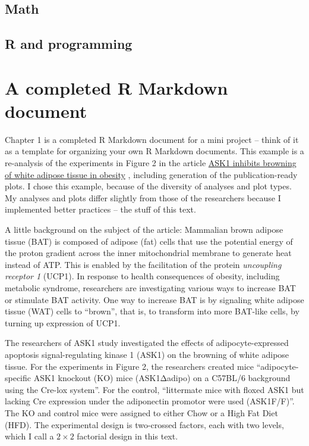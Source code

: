 \documentclass[]{book}
\begin{document}
\hypertarget{math}{%
\section{Math}\label{math}}

\hypertarget{r-and-programming}{%
\section{R and programming}\label{r-and-programming}}

\hypertarget{a-completed-r-markdown-document}{%
\chapter*{A completed R Markdown document}\label{a-completed-r-markdown-document}}

Chapter 1 is a completed R Markdown document for a mini project -- think of it as a template for organizing your own R Markdown documents. This example is a re-analysis of the experiments in Figure 2 in the article \href{https://www.nature.com/articles/s41467-020-15483-7}{ASK1 inhibits browning of white adipose tissue in obesity} , including generation of the publication-ready plots. I chose this example, because of the diversity of analyses and plot types. My analyses and plots differ slightly from those of the researchers because I implemented better practices -- the stuff of this text.

A little background on the subject of the article: Mammalian brown adipose tissue (BAT) is composed of adipose (fat) cells that use the potential energy of the proton gradient across the inner mitochondrial membrane to generate heat instead of ATP. This is enabled by the facilitation of the protein \emph{uncoupling receptor 1} (UCP1). In response to health consequences of obesity, including metabolic syndrome, researchers are investigating various ways to increase BAT or stimulate BAT activity. One way to increase BAT is by signaling white adipose tissue (WAT) cells to ``brown'', that is, to transform into more BAT-like cells, by turning up expression of UCP1.

The researchers of ASK1 study investigated the effects of adipocyte-expressed apoptosis signal-regulating kinase 1 (ASK1) on the browning of white adipose tissue. For the experiments in Figure 2, the researchers created mice ``adipocyte-specific ASK1 knockout (KO) mice (ASK1Δadipo) on a C57BL/6 background using the Cre-lox system''. For the control, ``littermate mice with floxed ASK1 but lacking Cre expression under the adiponectin promotor were used (ASK1F/F)''. The KO and control mice were assigned to either Chow or a High Fat Diet (HFD). The experimental design is two-crossed factors, each with two levels, which I call a \(2 \times 2\) factorial design in this text.
\end{document}
